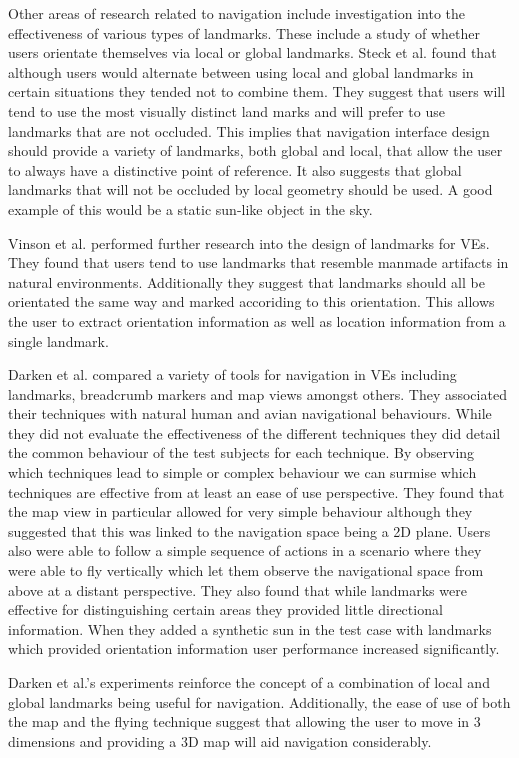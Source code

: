 \documentclass{sig-alternate-05-2015}
\begin{document}
Other areas of research related to navigation include investigation into the effectiveness of various types of landmarks. These include a study of whether users orientate themselves via local or global landmarks\cite{Steck2000}. Steck et al. found that although users would alternate between using local and global landmarks in certain situations they tended not to combine them. They suggest that users will tend to use the most visually distinct land marks and will prefer to use landmarks that are not occluded. This implies that navigation interface design should provide a variety of landmarks, both global and local, that allow the user to always have a distinctive point of reference. It also suggests that global landmarks that will not be occluded by local geometry should be used. A good example of this would be a static sun-like object in the sky.

Vinson et al. performed further research into the design of landmarks for VEs.\cite{Vinson1999} They found that users tend to use landmarks that resemble manmade artifacts in natural environments. Additionally they suggest that landmarks should all be orientated the same way and marked accoriding to this orientation. This allows the user to extract orientation information as well as location information from a single landmark.

Darken et al. compared a variety of tools for navigation in VEs including landmarks, breadcrumb markers and map views amongst others\cite{Darken1993}. They associated their techniques with natural human and avian  navigational behaviours. While they did not evaluate the effectiveness of the different techniques they did detail the common behaviour of the test subjects for each technique. By observing which techniques lead to simple or complex behaviour we can surmise which techniques are effective from at least an ease of use perspective. They found that the map view in particular allowed for very simple behaviour although they suggested that this was linked to the navigation space being a 2D plane. Users also were able to follow a simple sequence of actions in a scenario where they were able to fly vertically which let them observe the navigational space from above at a distant perspective. They also found that while landmarks were effective for distinguishing certain areas they provided little directional information. When they added a synthetic sun in the test case with landmarks which provided orientation information user performance increased significantly.

Darken et al.'s experiments reinforce the concept of a combination of local and global landmarks being useful for navigation.\cite{Darken1993} Additionally, the ease of use of both the map and the flying technique suggest that allowing the user to move in 3 dimensions and providing a 3D map will aid navigation considerably. 
\end{document}

